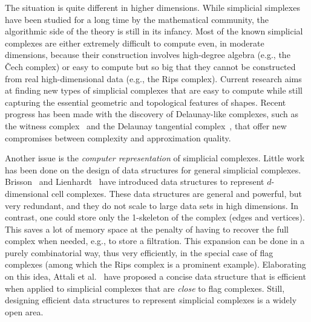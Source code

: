 The situation is quite different in higher dimensions. While simplicial simplexes have been studied for a long time by the mathematical community, the algorithmic side of the theory is still in its infancy. Most of the known simplicial complexes are either extremely difficult to compute even, in moderate dimensions, because their construction involves high-degree algebra (e.g., the  \v{C}ech complex) or easy to compute but so big that they cannot be constructed from real high-dimensional data (e.g., the Rips complex). Current research aims at finding new types of simplicial complexes that are easy to compute while still capturing the essential geometric and topological features of shapes. Recent progress has been made with the discovery of Delaunay-like complexes, such as the witness complex~\cite{cds-tewc-2004} and the Delaunay tangential complex~\cite{geometrica-7142i}, that offer new compromises between complexity and approximation quality.

 
Another issue is the {\em computer representation} of simplicial complexes. 
Little work has been done on the design of data structures for general
simplicial complexes. Brisson~\cite{Brisson:1989:RGS:73833.73858} and
Lienhardt~\cite{DBLP:journals/ijcga/Lienhardt94} have introduced data
structures to represent $d$-dimensional cell complexes. These data
structures are general and powerful, but very redundant, and they do
not scale to large data sets in high dimensions.  In contrast, one
could store only the 1-skeleton of the complex (edges and vertices). This 
saves a lot of memory space at the penalty of having to recover the full complex when needed, e.g., to store a filtration. This expansion can be done in a purely combinatorial way, thus very efficiently, in the special case of flag complexes (among which the Rips complex is a prominent example). Elaborating on this idea, Attali et al.~\cite{Attali2011} have proposed a concise data structure that is efficient when applied to simplicial complexes that are {\em close} to flag complexes. Still, designing efficient data structures to represent simplicial complexes is a widely open area.


\vspace{2mm}

